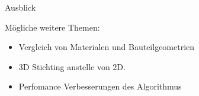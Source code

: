 \documentclass[../slides.tex]{subfiles}
\begin{document}
  \begin{frame}{Ausblick}
    \begin{minipage}[h]{.6\textwidth}
        \begin{block}{Mögliche weitere Themen:}
            \begin{itemize}
                \item Vergleich von Materialen und Bauteilgeometrien
                \item 3D Stichting anstelle von 2D.
                \item Perfomance Verbesserungen des Algorithmus
            \end{itemize}
        \end{block}
    \end{minipage}
    \hfill
    \begin{minipage}[h]{.39\textwidth}       
    \end{minipage}
  \end{frame}
\end{document}
